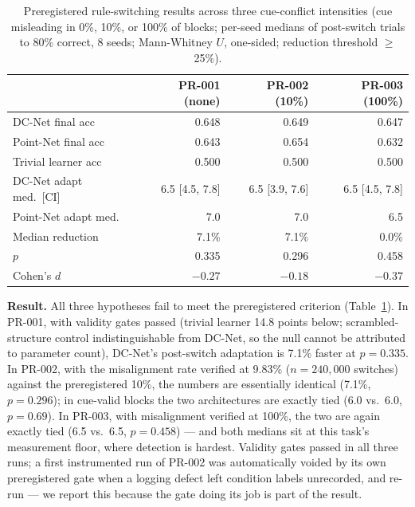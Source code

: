 \documentclass[conference]{IEEEtran}
\begin{document}
\begin{table}[t]
\centering
\caption{Preregistered rule-switching results across three cue-conflict intensities (cue
misleading in 0\%, 10\%, or 100\% of blocks; per-seed medians of post-switch trials to 80\%
correct, 8 seeds; Mann-Whitney $U$, one-sided; reduction threshold $\geq$25\%).}
\label{tab:prereg}
\scriptsize
\setlength{\tabcolsep}{2.5pt}
\begin{tabular}{@{}lrrr@{}}
\toprule
 & PR-001 (none) & PR-002 (10\%) & PR-003 (100\%) \\
\midrule
DC-Net final acc          & 0.648 & 0.649 & 0.647 \\
Point-Net final acc       & 0.643 & 0.654 & 0.632 \\
Trivial learner acc       & 0.500 & 0.500 & 0.500 \\
DC-Net adapt med.\ [CI]   & 6.5 [4.5, 7.8] & 6.5 [3.9, 7.6] & 6.5 [4.5, 7.8] \\
Point-Net adapt med.      & 7.0 & 7.0 & 6.5 \\
Median reduction          & 7.1\% & 7.1\% & 0.0\% \\
$p$                       & 0.335 & 0.296 & 0.458 \\
Cohen's $d$               & $-0.27$ & $-0.18$ & $-0.37$ \\
\bottomrule
\end{tabular}
\end{table}

\noindent\textbf{Result.} All three hypotheses fail to meet the preregistered criterion
(Table~\ref{tab:prereg}). In PR-001, with validity gates passed (trivial learner 14.8 points below;
scrambled-structure control indistinguishable from DC-Net, so the null cannot be attributed to
parameter count), DC-Net's post-switch adaptation is 7.1\% faster at $p=0.335$. In PR-002, with the
misalignment rate verified at 9.83\% ($n=240{,}000$ switches) against the preregistered 10\%, the
numbers are essentially identical (7.1\%, $p=0.296$); in cue-valid blocks the two architectures are
exactly tied (6.0 vs.\ 6.0, $p=0.69$). In PR-003, with misalignment verified at 100\%, the two are
again exactly tied (6.5 vs.\ 6.5, $p=0.458$) --- and both medians sit at this task's measurement
floor, where detection is hardest. Validity gates passed in all three runs; a first instrumented
run of PR-002 was automatically voided by its own preregistered gate when a logging defect left
condition labels unrecorded, and re-run --- we report this because the gate doing its job is part
of the result.
\end{document}
